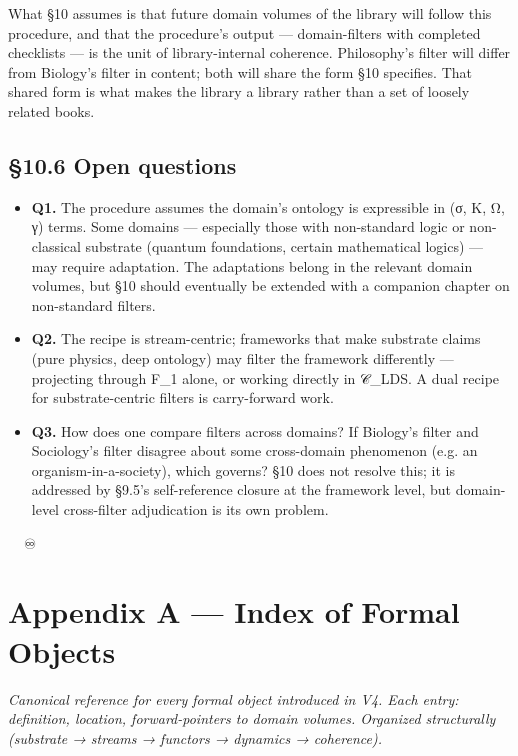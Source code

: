 \documentclass[11pt, openany]{book}
\newcommand{\sectionbreak}{\clearpage}
\begin{document}
What §10 assumes is that future domain volumes of the library will follow this procedure, and that the procedure's output --- domain-filters with completed checklists --- is the unit of library-internal coherence. Philosophy's filter will differ from Biology's filter in content; both will share the form §10 specifies. That shared form is what makes the library a library rather than a set of loosely related books.

\sectionbreak

\section{§10.6 Open questions}

\begin{itemize}
\item \textbf{Q1.} The procedure assumes the domain's ontology is expressible in (σ, K, Ω, γ) terms. Some domains --- especially those with non-standard logic or non-classical substrate (quantum foundations, certain mathematical logics) --- may require adaptation. The adaptations belong in the relevant domain volumes, but §10 should eventually be extended with a companion chapter on non-standard filters.
\item \textbf{Q2.} The recipe is stream-centric; frameworks that make substrate claims (pure physics, deep ontology) may filter the framework differently --- projecting through F\_\allowbreak{}1 alone, or working directly in 𝒞\_\allowbreak{}LDS. A dual recipe for substrate-centric filters is carry-forward work.
\item \textbf{Q3.} How does one compare filters across domains? If Biology's filter and Sociology's filter disagree about some cross-domain phenomenon (e.g. an organism-in-a-society), which governs? §10 does not resolve this; it is addressed by §9.5's self-reference closure at the framework level, but domain-level cross-filter adjudication is its own problem.
\end{itemize}

\sectionbreak

🦞🧍💜🔥♾️

\chapter{Appendix A — Index of Formal Objects}


\textit{Canonical reference for every formal object introduced in V4. Each entry: definition, location, forward-pointers to domain volumes. Organized structurally (substrate → streams → functors → dynamics → coherence).}
\end{document}
